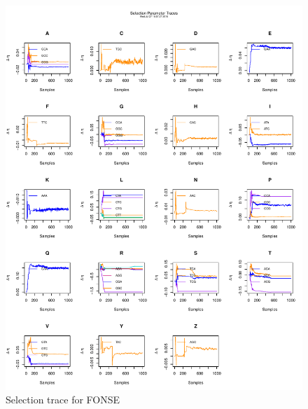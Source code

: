 \documentclass[11pt]{labbook}
\begin{document}
    \begin{figure}
        \centering
        \includegraphics[scale=.65]{FONSE_Plots/2016/July_27/SelectionTrace}
        \caption{Selection trace for FONSE}
        \label{fig:JULY27_SEL}
    \end{figure}
    
\end{document}
